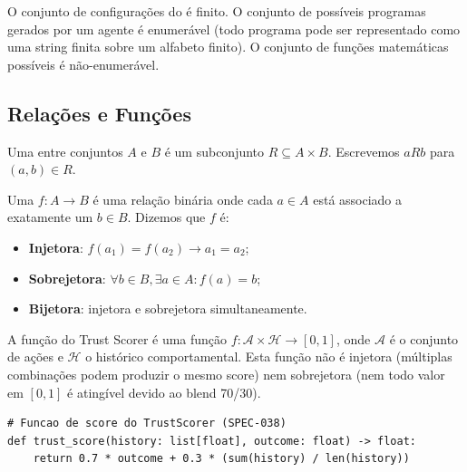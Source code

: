 \begin{exemplo}
    O conjunto de configurações do \opencodeeco{} é finito. O conjunto de
    possíveis programas gerados por um agente é enumerável (todo programa
    pode ser representado como uma string finita sobre um alfabeto finito).
    O conjunto de funções matemáticas possíveis é não-enumerável.
\end{exemplo}

\subsection{Relações e Funções}

\begin{definicao}
    Uma  entre conjuntos $A$ e $B$ é um subconjunto
    $R \subseteq A \times B$. Escrevemos $aRb$ para $(a,b) \in R$.
\end{definicao}

\begin{definicao}[Função]
    Uma  $f: A \to B$ é uma relação binária onde cada
    $a \in A$ está associado a exatamente um $b \in B$. Dizemos que $f$ é:
    \begin{itemize}
        \item \textbf{Injetora}: $f(a_1) = f(a_2) \to a_1 = a_2$;
        \item \textbf{Sobrejetora}: $\forall b \in B, \exists a \in A : f(a) = b$;
        \item \textbf{Bijetora}: injetora e sobrejetora simultaneamente.
    \end{itemize}
\end{definicao}

\begin{exemplo}
    A função  do Trust Scorer é uma função
    $f: \mathcal{A} \times \mathcal{H} \to [0,1]$, onde $\mathcal{A}$ é o
    conjunto de ações e $\mathcal{H}$ o histórico comportamental. Esta
    função não é injetora (múltiplas combinações podem produzir o mesmo
    score) nem sobrejetora (nem todo valor em $[0,1]$ é atingível devido
    ao blend 70/30).
\end{exemplo}

\begin{lstlisting}[style=pythonstyle]
# Funcao de score do TrustScorer (SPEC-038)
def trust_score(history: list[float], outcome: float) -> float:
    return 0.7 * outcome + 0.3 * (sum(history) / len(history))
\end{lstlisting}


